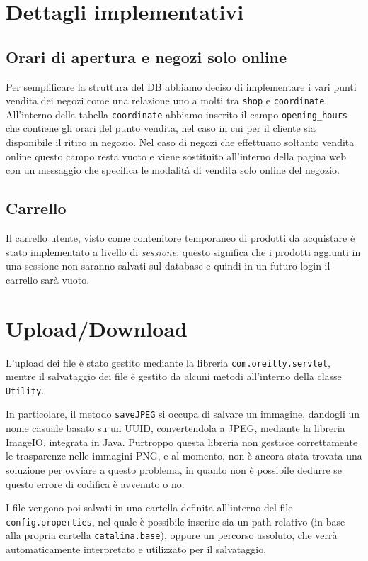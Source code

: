 \chapter{Dettagli implementativi}

\section{Orari di apertura e negozi solo online}
Per semplificare la struttura del DB abbiamo deciso di implementare i vari punti vendita dei negozi come una relazione uno a molti tra \texttt{shop} e \texttt{coordinate}. All'interno della tabella \texttt{coordinate} abbiamo inserito il campo \texttt{opening\_hours} che contiene gli orari del punto vendita, nel caso in cui per il cliente sia disponibile il ritiro in negozio. Nel caso di negozi che effettuano soltanto vendita online questo campo resta vuoto e viene sostituito all'interno della pagina web con un messaggio che specifica le modalità di vendita solo online del negozio.

\section{Carrello}
Il carrello utente, visto come contenitore temporaneo di prodotti da acquistare è stato implementato a livello di \textit{sessione}; questo significa che i prodotti aggiunti in una sessione non saranno salvati sul database e quindi in un futuro login il carrello sarà vuoto.

\chapter{Upload/Download}

L'upload dei file è stato gestito mediante la libreria \texttt{com.oreilly.servlet}, mentre il salvataggio dei file è gestito da alcuni metodi all'interno della classe \texttt{Utility}.

In particolare, il metodo \texttt{saveJPEG} si occupa di salvare un immagine, dandogli un nome casuale basato su un UUID, convertendola a JPEG, mediante la libreria ImageIO, integrata in Java.
Purtroppo questa libreria non gestisce correttamente le trasparenze nelle immagini PNG, e al momento, non è ancora stata trovata una soluzione per ovviare a questo problema, in quanto non è possibile dedurre se questo errore di codifica è avvenuto o no.

I file vengono poi salvati in una cartella definita all'interno del file \texttt{config.properties}, nel quale è possibile inserire sia un path relativo (in base alla propria cartella \texttt{catalina.base}), oppure un percorso assoluto, che verrà automaticamente interpretato e utilizzato per il salvataggio.

